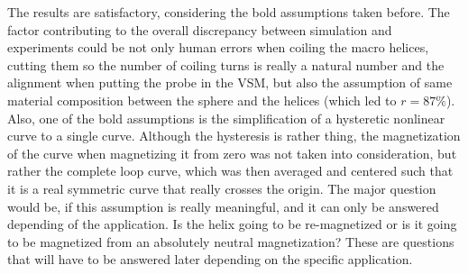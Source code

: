 The results are satisfactory, considering the bold assumptions taken before. The factor contributing to the overall discrepancy between simulation and experiments could be not only human errors when coiling the macro helices, cutting them so the number of coiling turns is really a natural number and the alignment when putting the probe in the VSM, but also the assumption of same material composition between the sphere and the helices (which led to $r = 87\%$). \\

Also, one of the bold assumptions is the simplification of a hysteretic nonlinear curve to a single curve. Although the hysteresis is rather thing, the magnetization of the curve when magnetizing it from zero was not taken into consideration, but rather the complete loop curve, which was then averaged and centered such that it is a real symmetric curve that really crosses the origin. The major question would be, if this assumption is really meaningful, and it can only be answered depending of the application. Is the helix going to be re-magnetized or is it going to be magnetized from an absolutely neutral magnetization? These are questions that will have to be answered later depending on the specific application.

